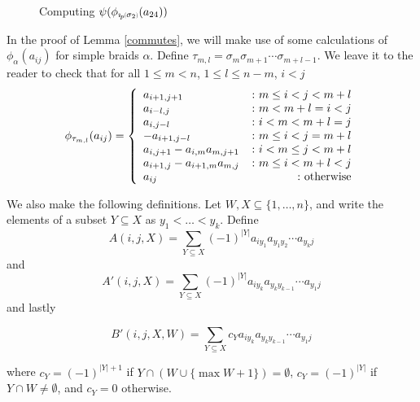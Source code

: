 \documentclass[11pt]{amsart}
\newcommand{\oarc}[4]{
\draw[thick, postaction={on each segment={mid arrow}}] (#1,#2) ..controls (#1 + .2,#2 + .7) and (#3 - .2,#4 + .7) .. (#3,#4);
}
\def\s{{\sigma}}
\newcommand*{\subsmallp}[1]{\scalebox{.5}{\ensuremath#1}}
\newcommand{\subpp}[2][p]{\imath_{\hspace*{-1pt}#1}\hspace*{-.5pt}\subsmallp(#2\subsmallp)}
\theoremstyle{definition}
\begin{document}
\begin{figure}[ht]
\caption{Computing $\psi(\phi_{\subpp{\s_2}}(a_{24}))$}
\label{FigCommutes}
\end{figure}


In the proof of Lemma \ref{commutes}, we will make use of some calculations of $\phi_\alpha(a_{ij})$ for simple braids $\alpha$.  Define $\tau_{m,l} = \s_m\s_{m+1}\cdots\s_{m+l-1}$.  We leave it to the reader to check that for all $1\le m < n$, $1\le l \le n - m$, $i<j$
\begin{equation}\label{tau}
\phi_{\tau_{m,l}}(a_{ij}) =
\left\{
     \begin{array}{lr}
       a_{i+1,j+1} & \colon m\le i<j< m+l\\
       a_{i-l,j} & \colon m<m+l=i<j\\
       a_{i,j-l} & \colon i<m<m+l=j\\
       -a_{i+1,j-l} & \colon m\le i < j = m+l\\
       a_{i,j+1}-a_{i,m}a_{m,j+1} & \colon i<m\le j< m+l\\
       a_{i+1,j}-a_{i+1,m}a_{m,j} & \colon m\le i< m+l<j\\
       a_{ij} & \colon \textnormal{otherwise}
     \end{array}
\right.
\end{equation}

\noindent We also make the following definitions.  Let $W,X\subseteq \{1,\ldots,n\}$, and write the elements of a subset $Y\subseteq X$ as $y_1<\ldots <y_k$.  Define
$$
 A(i,j,X) = \sum_{Y\subseteq X}(-1)^{|Y|}a_{iy_1}a_{y_1y_2}\cdots a_{y_kj}
$$
and
$$
 A'(i,j,X) = \sum_{Y\subseteq X}(-1)^{|Y|}a_{iy_k}a_{y_ky_{k-1}}\cdots a_{y_1j}
$$
and lastly

$$
B'(i,j,X,W) = \sum_{Y\subseteq X}c_Ya_{iy_k}a_{y_ky_{k-1}}\cdots a_{y_1j}
$$

where $c_Y = (-1)^{|Y|+1}$ if $Y\cap (W\cup\{\max{W} + 1\}) = \emptyset$, $c_Y = (-1)^{|Y|}$ if $Y\cap W\ne\emptyset$, and $c_Y = 0$ otherwise.
\end{document}
